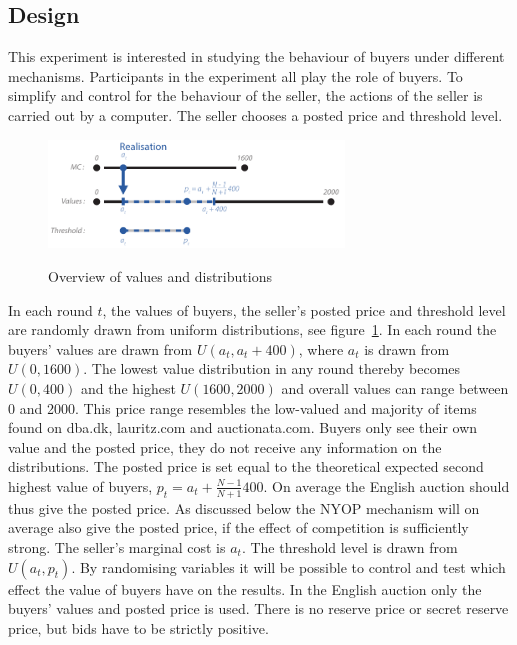 \documentclass[a4paper,12pt]{article}
\begin{document}
	\subsection{Design}
	\label{sec:design}

	This experiment is interested in studying the behaviour of buyers under different mechanisms. Participants in the experiment all play the role of buyers. To simplify and control for the behaviour of the seller, the actions of the seller is carried out by a computer. The seller chooses a posted price and threshold level.

	\begin{figure}[h]
	        \centering
	        \caption{Overview of values and distributions}
	        \includegraphics[width=0.7\textwidth]{Figures/Distribution}
			\label{fig:distribution}
	\end{figure}

	In each round $t$, the values of buyers, the seller's posted price and threshold level are randomly drawn from uniform distributions, see figure~\ref{fig:distribution}. In each round the buyers' values are drawn from $U(a_t , a_t + 400)$, where $a_t$ is drawn from $U(0, 1600)$. The lowest value distribution in any round thereby becomes $U(0, 400)$ and the highest $U(1600, 2000)$ and overall values can range between 0 and 2000. This price range resembles the low-valued and majority of items found on dba.dk, lauritz.com and auctionata.com. Buyers only see their own value and the posted price, they do not receive any information on the distributions. The posted price is set equal to the theoretical expected second highest value of buyers, $p_t = a_t + \frac{N-1}{N+1}400$. On average the English auction should thus give the posted price. As discussed below the NYOP mechanism will on average also give the posted price, if the effect of competition is sufficiently strong. The seller's marginal cost is $a_t$. The threshold level is drawn from $U(a_t, p_t)$. By randomising variables it will be possible to control and test which effect the value of buyers have on the results. In the English auction only the buyers' values and posted price is used. There is no reserve price or secret reserve price, but bids have to be strictly positive.
	
\end{document}
